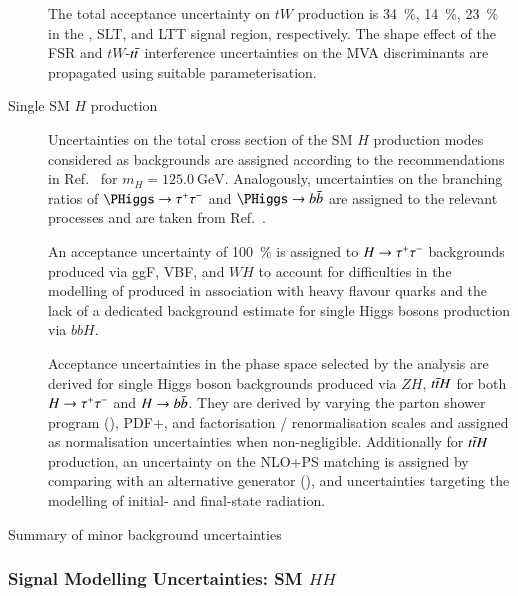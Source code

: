 \begin{description}
  The total acceptance uncertainty on $tW$ production is
  \SI{34}{\percent}, \SI{14}{\percent}, \SI{23}{\percent} in the
  \hadhad, \lephad SLT, and \lephad LTT signal region,
  respectively. The shape effect of the FSR and $tW$-$t\bar{t}$
  interference uncertainties on the MVA discriminants are propagated
  using suitable parameterisation.

\item[Single SM $H$ production] Uncertainties on the total cross
  section of the SM $H$ production modes considered as backgrounds are
  assigned according to the recommendations in
  Ref.~\cite{deFlorian:2016spz} for $m_{H} =
  \SI{125.0}{\GeV}$. Analogously, uncertainties on the branching
  ratios of $\PHiggs \to \tautau$ and $\PHiggs \to \bbbar$ are
  assigned to the relevant processes and are taken from
  Ref.~\cite{deFlorian:2016spz}.

  An acceptance uncertainty of \SI{100}{\percent} is assigned to
  $H \to \tau^{+} \tau^{-}$ backgrounds produced via ggF, VBF, and $WH$ to
  account for difficulties in the modelling of produced in association
  with heavy flavour quarks and the lack of a
  dedicated background estimate for single Higgs bosons production via
  $bbH$.

  Acceptance uncertainties in the phase space selected by the analysis
  are derived for single Higgs boson backgrounds produced via $ZH$,
  $t\bar{t} H$ for both $H \to \tau^{+} \tau^{-}$ and $H \to b\bar{b}$. They are
  derived by varying the parton shower program (\HERWIG[7]),
  PDF+\alphas, and factorisation / renormalisation scales and assigned
  as normalisation uncertainties when non-negligible. Additionally for
  $t\bar{t} H$ production, an uncertainty on the NLO+PS matching is
  assigned by comparing with an alternative generator
  (\MGNLO[v2.6.0]), and uncertainties targeting the modelling of
  initial- and final-state radiation.
\end{description}


\begin{table}[htbp]
  \centering


  \caption{Summary of minor background uncertainties}
\end{table}

\subsubsection{Signal Modelling Uncertainties: SM $HH$}

